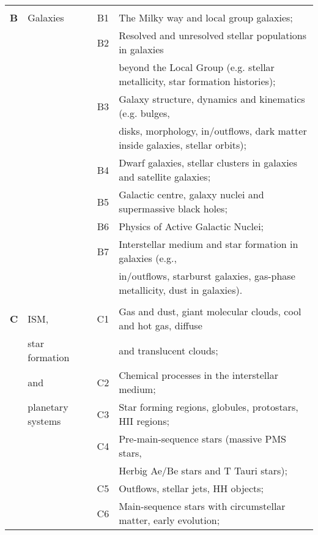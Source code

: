 \documentclass{article}
\begin{document}
\begin{table}[p]
{\begin{center}
\begin{tabular}{llcl}
\hline
& & & \\[-6pt]
{\bf B}& Galaxies  & B1 & The Milky way and local group galaxies; \\  
       &           & B2 & Resolved and unresolved stellar populations in galaxies \\
       &           &    & beyond the Local Group (e.g. stellar metallicity, star formation histories); \\
       &           & B3 & Galaxy structure, dynamics and kinematics (e.g. bulges, \\
       &           &    & disks, morphology, in/outflows, dark matter inside galaxies, stellar orbits); \\
       &           & B4 & Dwarf galaxies, stellar clusters in galaxies and satellite galaxies; \\
       &           & B5 & Galactic centre, galaxy nuclei and supermassive black holes; \\   
       &           & B6 & Physics of Active Galactic Nuclei; \\
       &           & B7 & Interstellar medium and star formation in galaxies (e.g., \\
       &           &    & in/outflows, starburst galaxies, gas-phase metallicity, dust in galaxies). \\[4pt]
\hline
& & & \\[-6pt]
{\bf C}& ISM, & C1 & Gas and dust, giant molecular clouds, cool and hot gas, diffuse \\
       & star formation &   & and translucent clouds; \\ 
       & and            &C2& Chemical processes in the interstellar medium; \\
       & planetary systems &C3& Star forming regions, globules, protostars, HII regions; \\
       &      & C4 & Pre-main-sequence stars (massive PMS stars, \\
       &      &    &  Herbig Ae/Be stars and T Tauri stars); \\  
       &      & C5 & Outflows, stellar jets, HH objects; \\
       &      & C6 & Main-sequence stars with circumstellar matter, early evolution;   \\

\end{tabular}
\end{center}}
\end{table}
\end{document}
